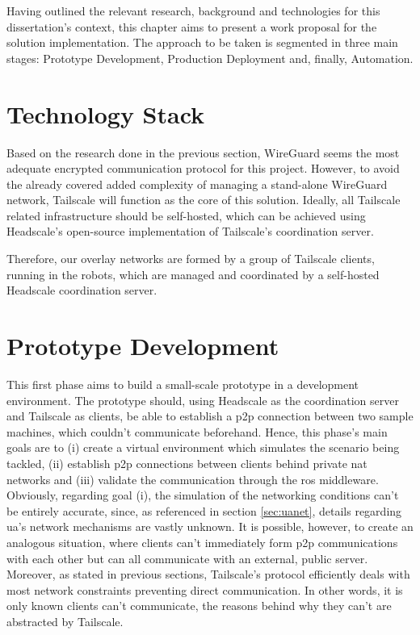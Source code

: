 \documentclass[11pt,twoside,a4paper]{report}
\begin{document}
Having outlined the relevant research, background and technologies for this dissertation's context, this chapter aims to present a work proposal for the solution implementation. The approach to be taken is segmented in three main stages: Prototype Development, Production Deployment and, finally, Automation.

\section{Technology Stack}

Based on the research done in the previous section, WireGuard seems the most adequate encrypted communication protocol for this project. However, to avoid the already covered added complexity of managing a stand-alone WireGuard network, Tailscale will function as the core of this solution. Ideally, all Tailscale related infrastructure should be self-hosted, which can be achieved using Headscale's open-source implementation of Tailscale's coordination server.

Therefore, our overlay networks are formed by a group of Tailscale clients, running in the robots, which are managed and coordinated by a self-hosted Headscale coordination server.

\section{Prototype Development}
\label{sec:protodev}

This first phase aims to build a small-scale prototype in a development environment. The prototype should, using Headscale as the coordination server and Tailscale as clients, be able to establish a \ac{p2p} connection between two sample machines, which couldn't communicate beforehand. Hence, this phase's main goals are to (i) create a virtual environment which simulates the scenario being tackled, (ii) establish \ac{p2p} connections between clients behind private \ac{nat} networks  and (iii) validate the communication through the \ac{ros} middleware. Obviously, regarding goal (i), the simulation of the networking conditions can't be entirely accurate, since, as referenced in section \ref{sec:uanet}, details regarding \ac{ua}'s network mechanisms are vastly unknown. It is possible, however, to create an analogous situation, where clients can't immediately form \ac{p2p} communications with each other but can all communicate with an external, public server. Moreover, as stated in previous sections, Tailscale's protocol efficiently deals with most network constraints preventing direct communication. In other words, it is only known clients can't communicate, the reasons behind why they can't are abstracted by Tailscale.
\end{document}
